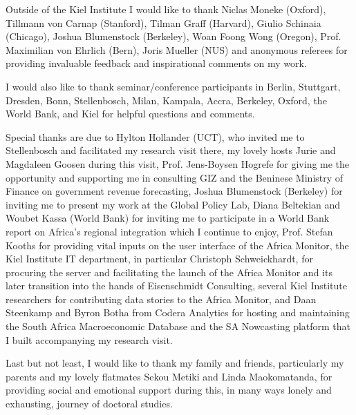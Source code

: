 \documentclass[openany]{book}
\begin{document}
 Outside of the Kiel Institute I would like to thank Niclas Moneke (Oxford), Tillmann von Carnap (Stanford), Tilman Graff (Harvard), Giulio Schinaia (Chicago), Joshua Blumenstock (Berkeley), Woan Foong Wong (Oregon), Prof. Maximilian von Ehrlich (Bern), Joris Mueller (NUS) and anonymous referees for providing invaluable feedback and inspirational comments on my work. \newline 
 
 I would also like to thank seminar/conference participants in Berlin, Stuttgart, Dresden, Bonn, Stellenbosch, Milan, Kampala, Accra, Berkeley, Oxford, the World Bank, and Kiel for helpful questions and comments. \newline 
 
 Special thanks are due to Hylton Hollander (UCT), who invited me to Stellenbosch and facilitated my research visit there, my lovely hosts Jurie and Magdaleen Goosen during this visit, Prof. Jens-Boysen Hogrefe for giving me the opportunity and supporting me in consulting GIZ and the Beninese Ministry of Finance on government revenue forecasting, Joshua Blumenstock (Berkeley) for inviting me to present my work at the Global Policy Lab, Diana Beltekian and Woubet Kassa (World Bank) for inviting me to participate in a World Bank report on Africa's regional integration which I continue to enjoy, Prof. Stefan Kooths for providing vital inputs on the user interface of the Africa Monitor, the Kiel Institute IT department, in particular Christoph Schweickhardt, for procuring the server and facilitating the launch of the Africa Monitor and its later transition into the hands of Eisenschmidt Consulting, several Kiel Institute researchers for contributing data stories to the Africa Monitor, and Daan Steenkamp and Byron Botha from Codera Analytics for hosting and maintaining the South Africa Macroeconomic Database and the SA Nowcasting platform that I built accompanying my research visit. \newline 
 
 Last but not least, I would like to thank my family and friends, particularly my parents and my lovely flatmates Sekou Metiki and Linda Maokomatanda, for providing social and emotional support during this, in many ways lonely and exhausting, journey of doctoral studies. %

\end{document}

